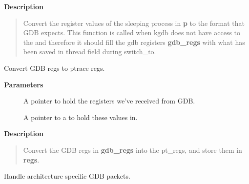 \documentclass[a4paper,8pt,english]{sphinxmanual}
\begin{document}
\textbf{Description}
\begin{quote}

Convert the register values of the sleeping process in \textbf{p} to
the format that GDB expects.
This function is called when kgdb does not have access to the
 and therefore it should fill the gdb registers
\textbf{gdb\_regs} with what has      been saved in 
thread field during switch\_to.
\end{quote}

\begin{fulllineitems}
\label{dev-tools/kgdb:c.gdb_regs_to_pt_regs}
Convert GDB regs to ptrace regs.

\end{fulllineitems}


\textbf{Parameters}
\begin{description}
\item[{}] \leavevmode
A pointer to hold the registers we've received from GDB.

\item[{}] \leavevmode
A pointer to a  to hold these values in.

\end{description}

\textbf{Description}
\begin{quote}

Convert the GDB regs in \textbf{gdb\_regs} into the pt\_regs, and store them
in \textbf{regs}.
\end{quote}

\begin{fulllineitems}
\label{dev-tools/kgdb:c.kgdb_arch_handle_exception}
Handle architecture specific GDB packets.

\end{fulllineitems}
\end{document}
